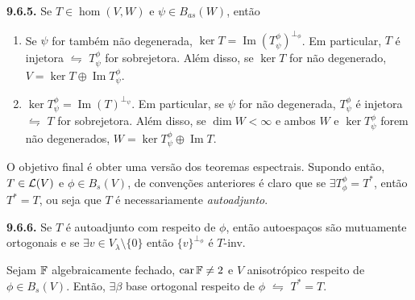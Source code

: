 \begin{lemma}
    \textbf{9.6.5.} Se \(T\in \hom(V,W )\) e \(\psi \in B_{as}(W)\), então 
    \vspace{-0.2cm}
    \begin{enumerate}[left = 0.5cm, label = (\alph*)]
        \item Se \(\psi \) for também não degenerada, \(\ker T = \operatorname{Im}(T^\phi_\psi)^{\perp_\phi}\). Em particular, \(T \) é injetora \(\leftrightharpoons\) \(T^\phi_\psi\) for sobrejetora. Além disso, se \(\ker T\) for não degenerado, \(V = \ker T \oplus \operatorname{Im}T^\phi_\psi\).  
        \item \(\ker T^\phi_\psi = \operatorname{Im}(T)^{\perp_\psi} \). Em particular, se \(\psi \) for não degenerada, \(T^\phi_\psi\) é injetora \(\leftrightharpoons\) \(T\) for sobrejetora. Além disso, se \(\dim W < \infty\) e ambos \(W\) e \(\ker T^\phi_\psi \) forem não degenerados, \(W = \ker T^\phi_\psi \oplus \operatorname{Im}T\). 
    \end{enumerate}
\end{lemma}

\begin{note}
    O objetivo final é obter uma versão dos teoremas espectrais. Supondo então, \(T \in \mathcal{L}(V)\) e \(\phi \in B_s(V)\), de convenções anteriores é claro que se \(\exists T^\phi_\phi = T^*\), então \(T^* = T\), ou seja que \(T\) é necessariamente \emph{autoadjunto}. 
\end{note}

\hypertarget{lemma966}{}
\begin{lemma}
    \textbf{9.6.6.} Se \(T\) é autoadjunto com respeito de \(\phi\), então autoespaços são mutuamente ortogonais e se \(\exists v \in V_\lambda\setminus\{0\}\) então \(\{v\}^{\perp_\phi}\) é \(T\)-inv.  
\end{lemma}

\begin{theorem}
    \label{thm:967}
    Sejam \(\mathbb{F}\) algebraicamente fechado, \(\operatorname{car}\mathbb{F} \neq 2\) e \(V\) anisotrópico respeito de \(\phi \in B_s(V)\). Então, \(\exists \beta\) base ortogonal respeito de \(\phi\) \(\leftrightharpoons\) \(T^* = T\). 
\end{theorem}


